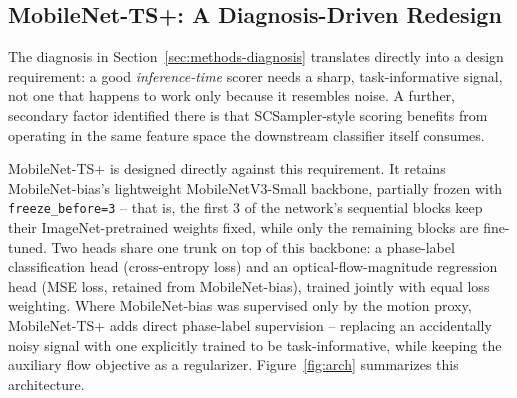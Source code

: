 \documentclass[preprint,12pt]{elsarticle}
\begin{document}
\subsection{MobileNet-TS+: A Diagnosis-Driven Redesign}
\label{sec:methods-tsplus}

The diagnosis in Section~\ref{sec:methods-diagnosis} translates directly into a design requirement: a good \emph{inference-time} scorer needs a sharp, task-informative signal, not one that happens to work only because it resembles noise. A further, secondary factor identified there is that SCSampler-style scoring benefits from operating in the same feature space the downstream classifier itself consumes.

MobileNet-TS+ is designed directly against this requirement. It retains MobileNet-bias's lightweight MobileNetV3-Small backbone, partially frozen with \texttt{freeze\_before=3} -- that is, the first 3 of the network's sequential blocks keep their ImageNet-pretrained weights fixed, while only the remaining blocks are fine-tuned. Two heads share one trunk on top of this backbone: a phase-label classification head (cross-entropy loss) and an optical-flow-magnitude regression head (MSE loss, retained from MobileNet-bias), trained jointly with equal loss weighting. Where MobileNet-bias was supervised only by the motion proxy, MobileNet-TS+ adds direct phase-label supervision -- replacing an accidentally noisy signal with one explicitly trained to be task-informative, while keeping the auxiliary flow objective as a regularizer. Figure~\ref{fig:arch} summarizes this architecture.
\end{document}
